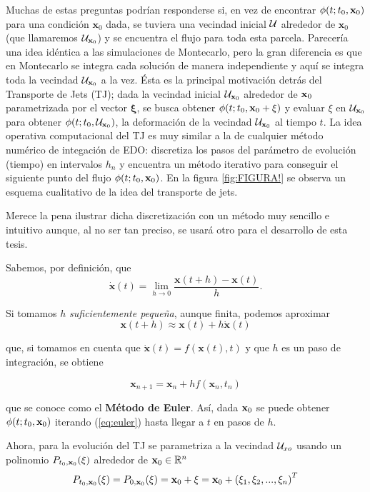 Muchas de estas preguntas podrían responderse si, en vez de encontrar $\phi(t;t_0,\mathbf{x}_0)$ para una condición $\mathbf{x}_0$ dada, se tuviera una vecindad inicial $\mathcal{U}$ alrededor de $\mathbf{x}_0$ (que llamaremos $\mathcal{U}_{\mathbf{x}_0}$) y se encuentra el flujo para toda esta parcela. Parecería una idea idéntica a las simulaciones de Montecarlo, pero la gran diferencia es que en Montecarlo se integra cada solución de manera independiente y aquí se integra toda la vecindad $\mathcal{U}_{\mathbf{x}_0}$ a la vez. Ésta es la principal motivación detrás del Transporte de Jets (TJ); dada la vecindad inicial $\mathcal{U}_{\mathbf{x}_0}$ alrededor de $\mathbf{x}_0$ parametrizada por el vector $\mathbf{\xi}$, se busca obtener $\phi(t;t_0,\mathbf{x}_0 + \xi)$ y evaluar $\xi$ en $\mathcal{U}_{\mathbf{x}_0}$ para obtener $\phi(t;t_0,\mathcal{U}_{\mathbf{x}_0} )$, la deformación de la vecindad $\mathcal{U}_{\mathbf{x}_0}$ al tiempo $t$. La idea operativa computacional del TJ es muy similar a la de cualquier método numérico de integación de EDO: discretiza los pasos del parámetro de evolución (tiempo) en intervalos $h_n$ y encuentra un método iterativo para conseguir el siguiente punto del flujo $\phi(t;t_0,\mathbf{x}_0)$. En la figura \ref{fig:FIGURA!} se observa un esquema cualitativo de la idea del transporte de jets.


Merece la pena ilustrar dicha discretización con un método muy sencillo e intuitivo aunque, al  no ser tan preciso, se usará otro para el desarrollo de esta tesis.

Sabemos, por definición, que 
\begin{equation*}
 \dot{\mathbf{x}}(t) = \lim_{h\to 0} \frac{\mathbf{x}(t+h)-\mathbf{x}(t)}{h}.
\end{equation*}  

Si tomamos $h$ \textit{suficientemente pequeña}, aunque finita, podemos aproximar
\begin{equation*}
 \mathbf{x}(t+h) \approx \mathbf{x}(t) + h \dot{\mathbf{x}}(t)
\end{equation*}

que, si tomamos en cuenta que $\dot{\mathbf{x}}(t) = f(\mathbf{x}(t),t)$ y que $h$ es un paso de integración, se obtiene
 
\begin{equation}
 \mathbf{x}_{n+1} = \mathbf{x}_n + h f(\mathbf{x}_n,t_n)
 \label{eq:euler} 
\end{equation}

que se conoce como el \textbf{Método de Euler}. Así, dada $\mathbf{x}_0$ se puede obtener $\phi(t;t_0,\mathbf{x}_0)$ iterando (\ref{eq:euler}) hasta llegar a $t$ en pasos de $h$.

Ahora, para la evolución del TJ se parametriza a la vecindad $\mathcal{U}_{xo}$ usando un polinomio $P_{t_0,\mathbf{x}_0}(\xi)$ alrededor de $\mathbf{x}_0 \in \mathbb{R}^n$ 
\begin{equation*}
 P_{t_0,\mathbf{x}_0}(\xi) = P_{0,\mathbf{x}_0}(\xi) = \mathbf{x}_0 + \xi = \mathbf{x}_0 + \left( \xi_1, \xi_2, ..., \xi_n \right)^T
\end{equation*} 

